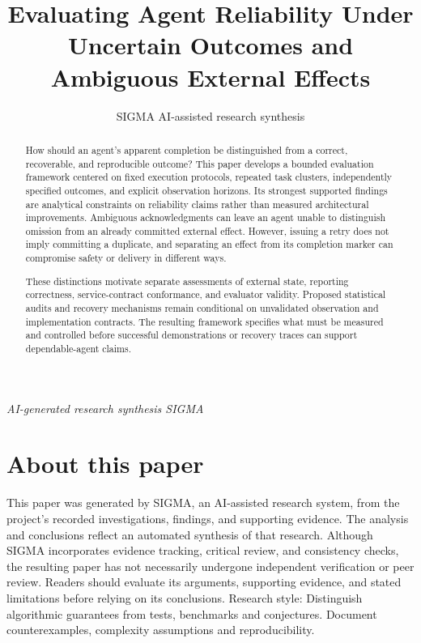 \documentclass[11pt]{article}
\title{Evaluating Agent Reliability Under Uncertain Outcomes and Ambiguous External Effects}
\date{}
\author{SIGMA AI-assisted research synthesis}
\begin{document}
\maketitle
\begin{center}\end{center}
\begin{center}\small\textit{AI-generated research synthesis \textperiodcentered{} SIGMA}\end{center}

\begin{abstract}
How should an agent\textquoteright{}s apparent completion be distinguished from a correct, recoverable, and reproducible outcome? This paper develops a bounded evaluation framework centered on fixed execution protocols, repeated task clusters, independently specified outcomes, and explicit observation horizons. Its strongest supported findings are analytical constraints on reliability claims rather than measured architectural improvements. Ambiguous acknowledgments can leave an agent unable to distinguish omission from an already committed external effect. However, issuing a retry does not imply committing a duplicate, and separating an effect from its completion marker can compromise safety or delivery in different ways.

These distinctions motivate separate assessments of external state, reporting correctness, service-contract conformance, and evaluator validity. Proposed statistical audits and recovery mechanisms remain conditional on unvalidated observation and implementation contracts. The resulting framework specifies what must be measured and controlled before successful demonstrations or recovery traces can support dependable-agent claims.
\end{abstract}
\section*{About this paper}
This paper was generated by SIGMA, an AI-assisted research system, from the project's recorded investigations, findings, and supporting evidence.
The analysis and conclusions reflect an automated synthesis of that research. Although SIGMA incorporates evidence tracking, critical review, and consistency checks, the resulting paper has not necessarily undergone independent verification or peer review.
Readers should evaluate its arguments, supporting evidence, and stated limitations before relying on its conclusions.
Research style: Distinguish algorithmic guarantees from tests, benchmarks and conjectures. Document counterexamples, complexity assumptions and reproducibility.
\end{document}
